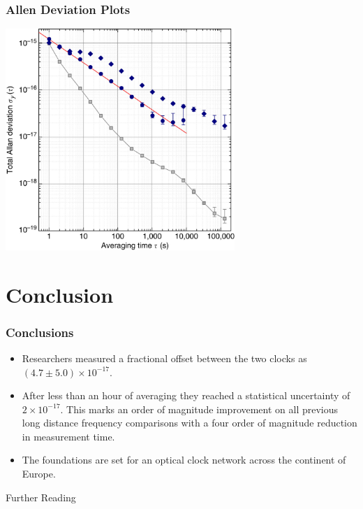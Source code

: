 \documentclass{beamer}
\begin{document}
\begin{frame}\frametitle{Allen Deviation Plots}
    \begin{center}
        \cite{Lisdat2016}
        \includegraphics[width=0.65\textwidth,keepaspectratio]{Images/Allen_Dev.jpg}
    \end{center}

\end{frame}

\section{Conclusion} 
\begin{frame}\frametitle{Conclusions}  
    \begin{itemize}
        \item Researchers measured a fractional offset between the two clocks as $(4.7\pm5.0)\times10^{-17}$.
        \item After less than an hour of averaging they reached a statistical uncertainty of $2\times10^{-17}$. This marks an order of magnitude improvement on all previous long distance frequency comparisons with a four order of magnitude reduction in measurement time.
        \item The foundations are set for an optical clock network across the continent of Europe.
    \end{itemize}
\end{frame}

\begin{frame}{Further Reading}
    \tiny
    
    
\end{frame}
\end{document}
